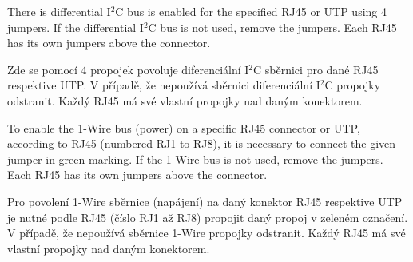 \begin{English}
\end{English}

\begin{Czech}
\end{Czech}


\begin{English}
There is differential I$^2$C bus is enabled for the specified RJ45 or UTP using 4 jumpers. If the differential I$^2$C bus is not used, remove the jumpers. Each RJ45 has its own jumpers above the connector.
\end{English}

\begin{Czech}
Zde se pomocí 4 propojek povoluje diferenciální I$^2$C sběrnici pro dané RJ45 respektive UTP. V případě, že nepoužívá sběrnici diferenciální I$^2$C propojky odstranit. Každý RJ45 má své vlastní propojky nad daným konektorem.
\end{Czech}


\begin{English}
\end{English}

\begin{Czech}
\end{Czech}


\begin{English}
To enable the 1-Wire bus (power) on a specific RJ45 connector or UTP, according to RJ45 (numbered RJ1 to RJ8), it is necessary to connect the given jumper in green marking. If the 1-Wire bus is not used, remove the jumpers. Each RJ45 has its own jumpers above the connector.
\end{English}

\begin{Czech}
Pro povolení 1-Wire sběrnice (napájení) na daný konektor RJ45 respektive UTP je nutné podle RJ45 (číslo RJ1 až RJ8) propojit daný propoj v zeleném označení. V případě, že nepoužívá sběrnice 1-Wire propojky odstranit. Každý RJ45 má své vlastní propojky nad daným konektorem.
\end{Czech}


\begin{English}
\end{English}

